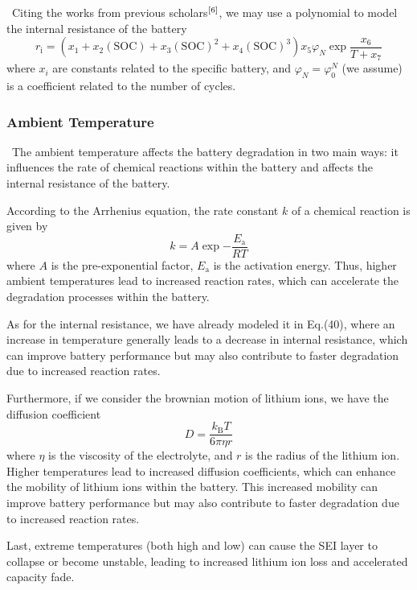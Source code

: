 \documentclass[12pt]{article}
\begin{document}
\quad \, Citing the works from previous scholars$\rm ^{[6]}$, we may use a polynomial to model the internal resistance of the battery
\begin{equation}
	r_\mathrm i=\left(x_1+x_2(\mathrm{SOC})+x_3(\mathrm{SOC})^2+x_4(\mathrm{SOC})^3\right)x_5\varphi_N\exp{\frac{x_6}{T+x_7}}
\end{equation}
where $x_i$ are constants related to the specific battery, and $\varphi_N=\varphi_0^N$ (we assume) is a coefficient related to the number of cycles.

\subsubsection{Ambient Temperature}

\quad \, The ambient temperature affects the battery degradation in two main ways: it influences the rate of chemical reactions within the battery and affects the internal resistance of the battery. 

According to the Arrhenius equation, the rate constant $k$ of a chemical reaction is given by
\begin{equation}
	k=A\exp{-\frac{E_\mathrm a}{RT}}
\end{equation}
where $A$ is the pre-exponential factor, $E_\mathrm a$ is the activation energy.
Thus, higher ambient temperatures lead to increased reaction rates, which can accelerate the degradation processes within the battery.

As for the internal resistance, we have already modeled it in Eq.(40), where an increase in temperature generally leads to a decrease in internal resistance, which can improve battery performance but may also contribute to faster degradation due to increased reaction rates.

Furthermore, if we consider the brownian motion of lithium ions, we have the diffusion coefficient
\begin{equation}	
	D=\frac{k_\mathrm BT}{6\pi \eta r}
\end{equation}
where $\eta$ is the viscosity of the electrolyte, and $r$ is the radius of the lithium ion. Higher temperatures lead to increased diffusion coefficients, which can enhance the mobility of lithium ions within the battery. This increased mobility can improve battery performance but may also contribute to faster degradation due to increased reaction rates.

Last, extreme temperatures (both high and low) can cause the SEI layer to collapse or become unstable, leading to increased lithium ion loss and accelerated capacity fade.
\end{document}
